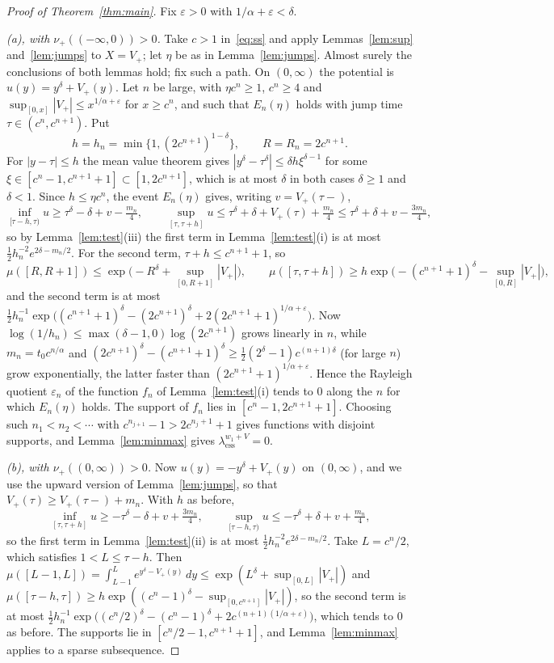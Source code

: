 \documentclass[11pt]{amsart}
\theoremstyle{remark}
\newcommand{\essbot}{\lambda_{\mathrm{ess}}}
\begin{document}
\begin{proof}[Proof of Theorem~\ref{thm:main}]
Fix $\varepsilon>0$ with $1/\alpha+\varepsilon<\delta$.

\emph{(a), with $\nu_+((-\infty,0))>0$.} Take $c>1$ in~\eqref{eq:ss} and apply Lemmas~\ref{lem:sup} and~\ref{lem:jumps} to $X=V_+$; let $\eta$ be as in Lemma~\ref{lem:jumps}. Almost surely the conclusions of both lemmas hold; fix such a path. On $(0,\infty)$ the potential is $u(y)=y^\delta+V_+(y)$. Let $n$ be large, with $\eta c^n\ge1$, $c^n\ge4$ and $\sup_{[0,x]}|V_+|\le x^{1/\alpha+\varepsilon}$ for $x\ge c^n$, and such that $E_n(\eta)$ holds with jump time $\tau\in(c^n,c^{n+1})$. Put
\[
h=h_n=\min\{1,(2c^{n+1})^{1-\delta}\},\qquad R=R_n=2c^{n+1}.
\]
For $|y-\tau|\le h$ the mean value theorem gives $|y^\delta-\tau^\delta|\le\delta h\xi^{\delta-1}$ for some $\xi\in[c^n-1,c^{n+1}+1]\subset[1,2c^{n+1}]$, which is at most $\delta$ in both cases $\delta\ge1$ and $\delta<1$. Since $h\le\eta c^n$, the event $E_n(\eta)$ gives, writing $v=V_+(\tau-)$,
\[
\inf_{[\tau-h,\tau)}u\ge\tau^\delta-\delta+v-\tfrac{m_n}4,\qquad\sup_{[\tau,\tau+h]}u\le\tau^\delta+\delta+V_+(\tau)+\tfrac{m_n}4\le\tau^\delta+\delta+v-\tfrac{3m_n}4,
\]
so by Lemma~\ref{lem:test}(iii) the first term in Lemma~\ref{lem:test}(i) is at most $\frac12h_n^{-2}e^{2\delta-m_n/2}$. For the second term, $\tau+h\le c^{n+1}+1$, so
\[
\mu([R,R+1])\le\exp\Big(-R^\delta+\sup_{[0,R+1]}|V_+|\Big),\qquad\mu([\tau,\tau+h])\ge h\exp\Big(-(c^{n+1}+1)^\delta-\sup_{[0,R]}|V_+|\Big),
\]
and the second term is at most $\frac12h_n^{-1}\exp\big((c^{n+1}+1)^\delta-(2c^{n+1})^\delta+2(2c^{n+1}+1)^{1/\alpha+\varepsilon}\big)$. Now $\log(1/h_n)\le\max(\delta-1,0)\log(2c^{n+1})$ grows linearly in $n$, while $m_n=t_0c^{n/\alpha}$ and $(2c^{n+1})^\delta-(c^{n+1}+1)^\delta\ge\frac12(2^\delta-1)c^{(n+1)\delta}$ (for large $n$) grow exponentially, the latter faster than $(2c^{n+1}+1)^{1/\alpha+\varepsilon}$. Hence the Rayleigh quotient $\varepsilon_n$ of the function $f_n$ of Lemma~\ref{lem:test}(i) tends to $0$ along the $n$ for which $E_n(\eta)$ holds. The support of $f_n$ lies in $[c^n-1,2c^{n+1}+1]$. Choosing such $n_1<n_2<\cdots$ with $c^{n_{j+1}}-1>2c^{n_j+1}+1$ gives functions with disjoint supports, and Lemma~\ref{lem:minmax} gives $\essbot^{w_1+V}=0$.

\emph{(b), with $\nu_+((0,\infty))>0$.} Now $u(y)=-y^\delta+V_+(y)$ on $(0,\infty)$, and we use the upward version of Lemma~\ref{lem:jumps}, so that $V_+(\tau)\ge V_+(\tau-)+m_n$. With $h$ as before,
\[
\inf_{[\tau,\tau+h]}u\ge-\tau^\delta-\delta+v+\tfrac{3m_n}4,\qquad\sup_{[\tau-h,\tau)}u\le-\tau^\delta+\delta+v+\tfrac{m_n}4,
\]
so the first term in Lemma~\ref{lem:test}(ii) is at most $\frac12h_n^{-2}e^{2\delta-m_n/2}$. Take $L=c^n/2$, which satisfies $1<L\le\tau-h$. Then $\mu([L-1,L])=\int_{L-1}^Le^{y^\delta-V_+(y)}\,dy\le\exp(L^\delta+\sup_{[0,L]}|V_+|)$ and $\mu([\tau-h,\tau])\ge h\exp((c^n-1)^\delta-\sup_{[0,c^{n+1}]}|V_+|)$, so the second term is at most $\frac12h_n^{-1}\exp\big((c^n/2)^\delta-(c^n-1)^\delta+2c^{(n+1)(1/\alpha+\varepsilon)}\big)$, which tends to $0$ as before. The supports lie in $[c^n/2-1,c^{n+1}+1]$, and Lemma~\ref{lem:minmax} applies to a sparse subsequence.


\end{proof}
\end{document}
